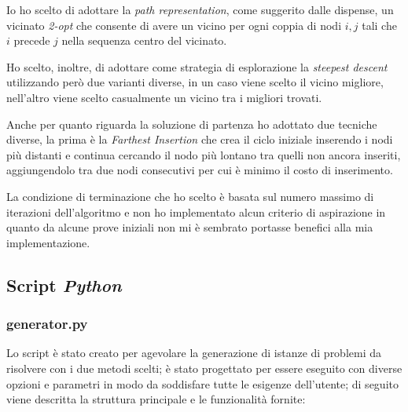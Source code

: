 Io ho scelto di adottare la \emph{path representation}, come suggerito dalle dispense, un vicinato \emph{2-opt} che consente di avere un vicino per ogni coppia di nodi $i, j$ tali che $i$ precede $j$ nella sequenza centro del vicinato.

Ho scelto, inoltre, di adottare come strategia di esplorazione la \emph{steepest descent} utilizzando però due varianti diverse, in un caso viene scelto il vicino migliore, nell'altro viene scelto casualmente un vicino tra i migliori trovati.

Anche per quanto riguarda la soluzione di partenza ho adottato due tecniche diverse, la prima è la \emph{Farthest Insertion} che crea il ciclo iniziale inserendo i nodi più distanti e continua cercando il nodo più lontano tra quelli non ancora inseriti, aggiungendolo tra due nodi consecutivi per cui è minimo il costo di inserimento.

La condizione di terminazione che ho scelto è basata sul numero massimo di iterazioni dell'algoritmo e non ho implementato alcun criterio di aspirazione in quanto da alcune prove iniziali non mi è sembrato portasse benefici alla mia implementazione.

\subsection{Script \emph{Python}}
\subsubsection{generator.py}
Lo script  è stato creato per agevolare la generazione di istanze di problemi da risolvere con i due metodi scelti; è stato progettato per essere eseguito con diverse opzioni e parametri in modo da soddisfare tutte le esigenze dell'utente; di seguito viene descritta la struttura principale e le funzionalità fornite:

